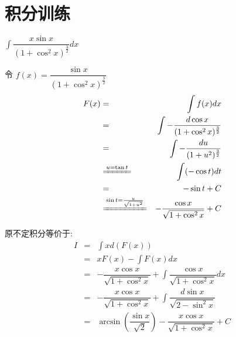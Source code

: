 \section*{积分训练}
\begin{proposition}
	$\int \dfrac{x\sin x}{(1+\cos^2x)^{\frac{3}{2}}}dx$
\end{proposition}
\begin{solution}
		
	令 $f(x) = \dfrac{\sin x}{(1+\cos^2x)^{\frac{3}{2}}}$
	\begin{eqnarray*}
		F(x)&=&\int f(x)dx\\
			&=&\int -\dfrac{d\cos x}{(1+\cos^2x)^{\frac{3}{2}}}\\
			&=&\int -\dfrac{du}{(1+u^2)^{\frac{3}{2}}}\\
			&\xlongequal{u=\tan t}&\int (-\cos t)dt\\
			&=&-\sin t+C\\
			&\xlongequal{\sin t=\frac{u}{\sqrt{1+u^2}}}&-\dfrac{\cos x}{\sqrt{1+\cos^2 x}}+C
	\end{eqnarray*}
	
	原不定积分等价于:  
	\begin{eqnarray*}
		I&=&\int xd(F(x))\\
		&=&xF(x)-\int F(x)dx\\
		&=&-\dfrac{x\cos x}{\sqrt{1+\cos^2 x}}+\int \dfrac{\cos x}{\sqrt{1+\cos^2 x}}dx\\
		&=&-\dfrac{x\cos x}{\sqrt{1+\cos^2 x}}+\int \dfrac{d\sin x}{\sqrt{2-\sin^2 x}}\\
		&=&\arcsin(\dfrac{\sin x}{\sqrt{2}})-\dfrac{x\cos x}{\sqrt{1+\cos^2 x}}+C
	\end{eqnarray*}
\end{solution}

